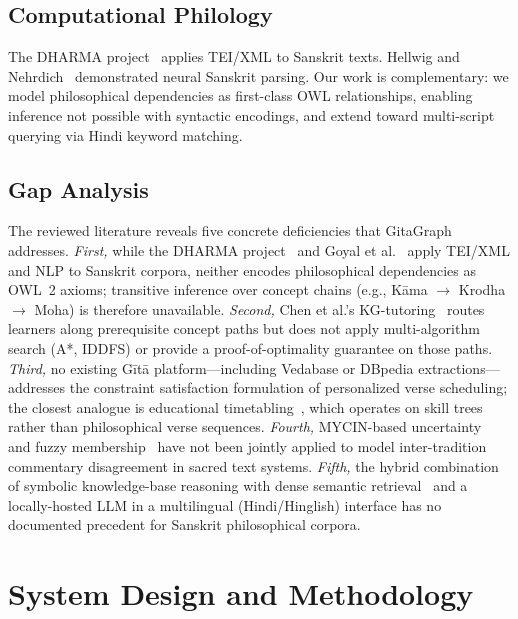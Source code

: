 \documentclass[conference]{IEEEtran}
\begin{document}
\subsection{Computational Philology}

The DHARMA project~\cite{dharma2020} applies TEI/XML to Sanskrit texts.
Hellwig and Nehrdich~\cite{hellwig2018sanskrit} demonstrated neural Sanskrit
parsing. Our work is complementary: we model philosophical dependencies as
first-class OWL relationships, enabling inference not possible with syntactic
encodings, and extend toward multi-script querying via Hindi keyword matching.

\subsection{Gap Analysis}

The reviewed literature reveals five concrete deficiencies that GitaGraph addresses.
\textit{First,} while the DHARMA project~\cite{dharma2020} and Goyal
et al.~\cite{goyal2012sanskrit} apply TEI/XML and NLP to Sanskrit corpora, neither
encodes philosophical dependencies as OWL~2 axioms; transitive inference over concept
chains (e.g., K\={a}ma $\to$ Krodha $\to$ Moha) is therefore unavailable.
\textit{Second,} Chen et al.'s KG-tutoring~\cite{chen2018kgtutor} routes learners
along prerequisite concept paths but does not apply multi-algorithm search (A*, IDDFS)
or provide a proof-of-optimality guarantee on those paths.
\textit{Third,} no existing G\={i}t\={a} platform—including Vedabase or DBpedia
extractions—addresses the constraint satisfaction formulation of personalized verse
scheduling; the closest analogue is educational timetabling~\cite{kumar1992algorithms},
which operates on skill trees rather than philosophical verse sequences.
\textit{Fourth,} MYCIN-based uncertainty~\cite{shortliffe1976computer} and fuzzy
membership~\cite{zadeh1965fuzzy} have not been jointly applied to model inter-tradition
commentary disagreement in sacred text systems.
\textit{Fifth,} the hybrid combination of symbolic knowledge-base reasoning with
dense semantic retrieval~\cite{lewis2020rag} and a locally-hosted LLM in a multilingual
(Hindi/Hinglish) interface has no documented precedent for Sanskrit philosophical corpora.

\section{System Design and Methodology}
\end{document}
